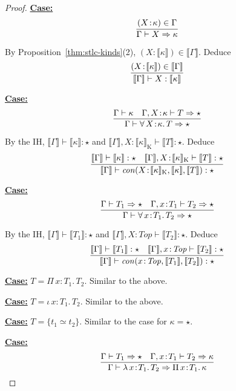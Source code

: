 \documentclass{article}
\newcommand{\abs}[4]{{#1}\, #2\! : \! #3.\, #4}
\newcommand{\interp}[1]{\llbracket #1 \rrbracket}
\newcommand{\tpsynth}[0]{\Rightarrow}
\newcommand{\startcase}[1]{\vspace{#1} \noindent\textbf{\underline{Case:}}}
\begin{document}
\begin{proof}
  \startcase{.2cm}
  \[
    \infer{
      \Gamma \vdash X \tpsynth \kappa
    }{
      (X\!:\!\kappa) \in \Gamma
    }
  \]

  By Proposition~\ref{thm:stlc-kinds}(2), \((X\!:\!\interp{\kappa}) \in
  \interp{\Gamma}\).
  Deduce
  \[
    \infer{
      \interp{\Gamma} \vdash X : \interp{\kappa}
    }{
      (X\!:\!\interp{\kappa}) \in \interp{\Gamma}
    }
  \]

  \startcase{.2cm}
  \[
    \infer{
      \Gamma \vdash \abs{\forall}{X}{\kappa}{T} \tpsynth \star
    }{
      \Gamma \vdash \kappa
      \quad \Gamma,X\!:\!\kappa \vdash T \tpsynth \star
    }
  \]

  By the IH, \(\interp{\Gamma} \vdash \interp{\kappa}: \star\) and
  \(\interp{\Gamma},X\!:\!\interp{\kappa}_{\text{K}} \vdash \interp{T} : \star\).
  Deduce
  \[
    \infer{
      \interp{\Gamma} \vdash
      \mathit{con}(X\!:\!\interp{\kappa}_{\text{K}},\interp{\kappa},\interp{T})
      : \star
    }{
      \interp{\Gamma} \vdash \interp{\kappa} : \star
      \quad \interp{\Gamma},X\!:\!\interp{\kappa}_{\text{K}} \vdash \interp{T} : \star
    }
  \]

  \startcase{.2cm}
  \[
    \infer{
      \Gamma \vdash \abs{\forall}{x}{T_1}{T_2} \tpsynth \star
    }{
      \Gamma \vdash T_1 \tpsynth \star
      \quad \Gamma,x\!:\!T_1 \vdash T_2 \tpsynth \star
    }
  \]

  By the IH, \(\interp{\Gamma} \vdash \interp{T_1}: \star\) and
  \(\interp{\Gamma},X\!:\!\mathit{Top} \vdash \interp{T_2} : \star\).
  Deduce
  \[
    \infer{
      \interp{\Gamma} \vdash
      \mathit{con}(x\!:\!\mathit{Top},\interp{T_1},\interp{T_2})
      : \star
    }{
      \interp{\Gamma} \vdash \interp{T_1} : \star
      \quad \interp{\Gamma},x\!:\!\mathit{Top} \vdash \interp{T_2} : \star
    }
  \]

  \startcase{.2cm} \(T = \abs{\Pi}{x}{T_1}{T_2}\).
  Similar to the above.

  \startcase{.2cm} \(T = \abs{\iota}{x}{T_1}{T_2}\).
  Similar to the above.

  \startcase{.2cm} \(T = \{t_1 \simeq t_2\}\).
  Similar to the case for \(\kappa = \star\).

  \startcase{.2cm}
  \[
    \infer{
      \Gamma \vdash \abs{\lambda}{x}{T_1}{T_2} \tpsynth \abs{\Pi}{x}{T_1}{\kappa}
    }{
      \Gamma \vdash T_1 \tpsynth \star
      \quad \Gamma,x\!:\!T_1 \vdash T_2 \tpsynth \kappa
    }
  \]


\end{proof}
\end{document}

